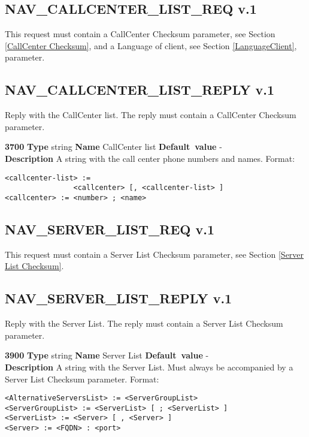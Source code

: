 \documentclass[a4paper]{article}
\begin{document}
\subsection{NAV\_CALLCENTER\_LIST\_REQ v.1}

This request must contain a CallCenter Checksum parameter, see Section 
\ref{CallCenter Checksum}, and a Language of client, see Section 
\ref{LanguageClient}, parameter.


\subsection{NAV\_CALLCENTER\_LIST\_REPLY v.1}

Reply with the CallCenter list. The reply must contain a CallCenter Checksum 
parameter.

\begin{list}{\textbf{ParamID}}{}
\item \textbf{3700} \textbf{Type} string \textbf{Name} CallCenter list
                 \textbf{Default~value} - \\
  \textbf{Description} A string with the call center phone numbers and names. 
  Format:
\begin{verbatim}
<callcenter-list> := 
                <callcenter> [, <callcenter-list> ]
<callcenter> := <number> ; <name>
\end{verbatim}
\end{list}


\subsection{NAV\_SERVER\_LIST\_REQ v.1}

This request must contain a Server List Checksum parameter, see Section 
\ref{Server List Checksum}.


\subsection{NAV\_SERVER\_LIST\_REPLY v.1}

Reply with the Server List. The reply must contain a Server List Checksum
parameter.

\begin{list}{\textbf{ParamID}}{}
  \item \textbf{3900} \textbf{Type} string \textbf{Name}  Server List
                 \textbf{Default~value} - \\
  \textbf{Description} A string with the Server List. 
  Must always be accompanied by a Server List Checksum parameter.
  Format:
\begin{verbatim}
<AlternativeServersList> := <ServerGroupList>
<ServerGroupList> := <ServerList> [ ; <ServerList> ]
<ServerList> := <Server> [ , <Server> ]
<Server> := <FQDN> : <port>
\end{verbatim}
\end{list}
\end{document}
